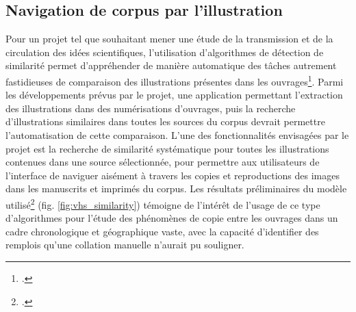 \subsection{Navigation de corpus par l'illustration}
Pour un projet tel que \vhs souhaitant mener une étude de la transmission et de la circulation des idées scientifiques, l'utilisation d'algorithmes de détection de similarité permet d'appréhender de manière automatique des tâches autrement fastidieuses de comparaison des illustrations présentes dans les ouvrages\footcite{kaouaImageCollationMatching2021}. Parmi les développements prévus par le projet, une application permettant l'extraction des illustrations dans des numérisations d'ouvrages, puis la recherche d'illustrations similaires dans toutes les sources du corpus devrait permettre l'automatisation de cette comparaison. L'une des fonctionnalités envisagées par le projet est la recherche de similarité systématique pour toutes les illustrations contenues dans une source sélectionnée, pour permettre aux utilisateurs de l'interface de naviguer aisément à travers les copies et reproductions des images dans les manuscrits et imprimés du corpus. Les résultats préliminaires du modèle utilisé\footcite{kaouaImageCollationMatching2021} (fig. \ref{fig:vhs_similarity}) témoigne de l'intérêt de l'usage de ce type d'algorithmes pour l'étude des phénomènes de copie entre les ouvrages dans un cadre chronologique et géographique vaste, avec la capacité d'identifier des remplois qu'une collation manuelle n'aurait pu souligner.

